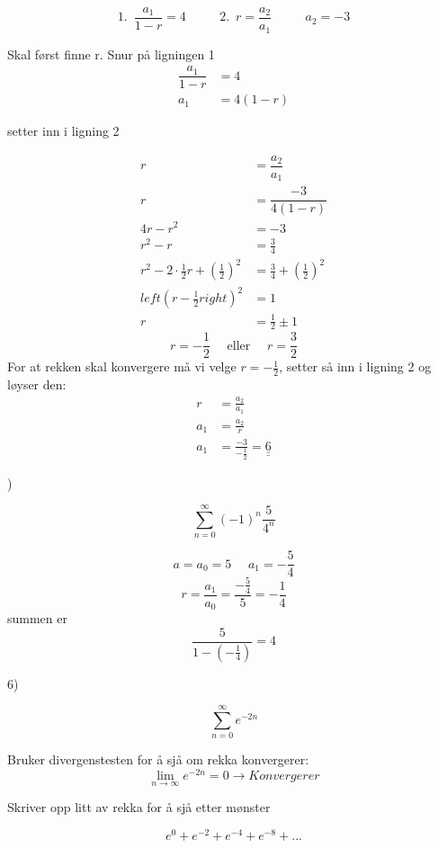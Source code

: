 \documentclass[11pt]{article}
\theoremstyle{definition}
\theoremstyle{definition}
\theoremstyle{definition}
\theoremstyle{definition}
\theoremstyle{definition}
\theoremstyle{definition}
\begin{document}
		\[1.\,\,\, \dfrac{a_1}{1-r}=4 \hspace{32pt} 2. \,\,\, r=\frac{a_2}{a_1}\hspace{32pt} a_2=-3\]
		
		Skal først finne r. Snur på ligningen 1
		\begin{align*}
		\dfrac{a_1}{1-r}&=4\\
		a_1&=4(1-r)
		\end{align*}
		
		setter inn i ligning 2
		
		\begin{align*}
		r&=\dfrac{a_2}{a_1} \\
		r&=\dfrac{-3}{4(1-r)} \\
		4r-r^2&=-3\\
		r^2-r&=\frac{3}{4}\\
		r^2-2\cdot \frac{1}{2}r+\left( \frac{1}{2} \right)^2&=\frac{3}{4}+\left( \frac{1}{2} \right)^2\\
		left(r-\frac{1}{2}right)^2&=1\\
		r&=\frac{1}{2} \pm 1  
 		\end{align*}
		\[r=-\frac{1}{2} \hspace{16pt} \text{eller} \hspace{16pt}r=\frac{3}{2}\]
		For at rekken skal konvergere må vi velge \(r=-\frac{1}{2}\), setter så inn i ligning 2 og løyser den:
		\begin{align*}
	    r&=\frac{a_2}{a_1}\\
	    a_1&=\frac{a_2}{r}\\
	    a_1&=\frac{-3}{-\frac{1}{2}}=\underline{\underline{6}}
		\end{align*}
		
		)

		\[\sum_{n=0}^{\infty}(-1)^n\dfrac{5}{4^n} \]
				
		\[a=a_0=5 \hspace{16pt} a_1=-\dfrac{5}{4}\]
		\[r=\frac{a_1}{a_0}=\frac{-\frac{5}{4}}{5}=-\frac{1}{4}\]
		summen er \[\dfrac{5}{1-(-\frac{1}{4})}=4\]
		
		6)
		
		\[\sum_{n=0}^{\infty}e^{-2n}\]
		
		Bruker divergenstesten for å sjå om rekka konvergerer:
		\[\lim\limits_{n\rightarrow \infty}e^{-2n}=0 \rightarrow Konvergerer\]
		
		Skriver opp litt av rekka for å sjå etter mønster
		
		\[e^0+e^{-2}+e^{-4}+e^{-8}+...\]
		
\end{document}

